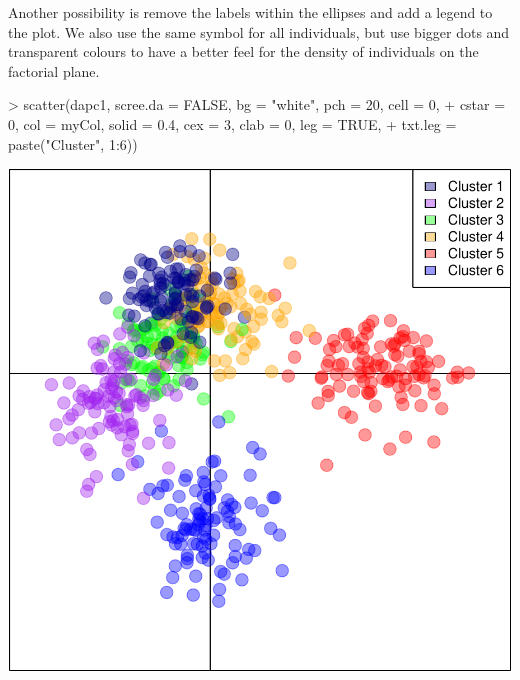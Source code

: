 \documentclass{article}
\begin{document}
\noindent Another possibility is remove the labels within the ellipses and add a legend to the
plot. We also use the same symbol for all individuals, but use bigger dots and transparent colours
to have a better feel for the density of individuals on the factorial plane.
\begin{Schunk}
\begin{Sinput}
> scatter(dapc1, scree.da = FALSE, bg = "white", pch = 20, cell = 0, 
+     cstar = 0, col = myCol, solid = 0.4, cex = 3, clab = 0, leg = TRUE, 
+     txt.leg = paste("Cluster", 1:6))
\end{Sinput}
\end{Schunk}
\includegraphics{figs/dapc-013}
\end{document}
